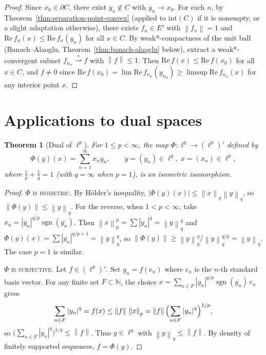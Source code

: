 \documentclass[a4paper,12pt]{book}
\DeclareMathOperator{\sgn}{sgn}
\newcommand{\N}{\mathbb{N}}
\newcommand{\norm}[1]{\left\| #1 \right\|}
\newcommand{\abs}[1]{\left| #1 \right|}
\newcommand{\weakstarto}{\overset{*}{\rightharpoonup}}
\theoremstyle{definition}
\theoremstyle{plain}
\newtheorem{theorem}[definition]{Theorem}
\theoremstyle{remark}
\begin{document}
\begin{proof}
Since $x_0\in\partial C$, there exist $y_n\notin C$ with $y_n\to x_0$.
For each $n$, by Theorem~\ref{thm:separation-point-convex} (applied to
$\mathrm{int}(C)$ if it is nonempty, or a slight adaptation otherwise),
there exists $f_n\in E'$ with $\norm{f_n}=1$ and
$\mathrm{Re}\,f_n(x)\leq\mathrm{Re}\,f_n(y_n)$ for all $x\in C$.
By weak*-compactness of the unit ball (Banach--Alaoglu, Theorem~\ref{thm:banach-alaoglu}
below), extract a weak*-convergent subnet $f_{n_\alpha}\weakstarto f$ with
$\norm{f}\leq 1$. Then $\mathrm{Re}\,f(x)\leq\mathrm{Re}\,f(x_0)$ for all
$x\in C$, and $f\neq 0$ since $\mathrm{Re}\,f(x_0)=\lim\mathrm{Re}\,f_{n_\alpha}(y_{n_\alpha})
\geq\limsup\mathrm{Re}\,f_{n_\alpha}(x)$ for any interior point $x$.
\end{proof}

\section{Applications to dual spaces}

\begin{theorem}[Dual of $\ell^p$]\label{thm:dual-ellp}
For $1\leq p<\infty$, the map $\Phi\colon\ell^q\to(\ell^p)'$ defined by
\[
  \Phi(y)(x) = \sum_{n=1}^{\infty}x_n y_n, \qquad y=(y_n)\in\ell^q,\;
  x=(x_n)\in\ell^p,
\]
where $\frac{1}{p}+\frac{1}{q}=1$ (with $q=\infty$ when $p=1$), is an
isometric isomorphism.
\end{theorem}

\begin{proof}
\textsc{$\Phi$ is isometric.}
By H\"older's inequality, $\abs{\Phi(y)(x)}\leq\norm{x}_p\norm{y}_q$, so
$\norm{\Phi(y)}\leq\norm{y}_q$. For the reverse, when $1<p<\infty$,
take $x_n = \abs{y_n}^{q/p}\sgn(\overline{y_n})$. Then
$\norm{x}_p^p = \sum\abs{y_n}^q = \norm{y}_q^q$ and
$\Phi(y)(x) = \sum\abs{y_n}^{q/p+1}=\norm{y}_q^q$, so
$\norm{\Phi(y)}\geq\norm{y}_q^q/\norm{y}_q^{q/p}=\norm{y}_q$.
The case $p=1$ is similar.

\textsc{$\Phi$ is surjective.}
Let $f\in(\ell^p)'$. Set $y_n = f(e_n)$ where $e_n$ is the $n$-th standard
basis vector. For any finite set $F\subset\N$, the choice
$x = \sum_{n\in F}\abs{y_n}^{q/p}\sgn(\overline{y_n})\,e_n$ gives
\[
  \sum_{n\in F}\abs{y_n}^q = f(x) \leq \norm{f}\,\norm{x}_p
  = \norm{f}\Bigl(\sum_{n\in F}\abs{y_n}^q\Bigr)^{1/p},
\]
so $\bigl(\sum_{n\in F}\abs{y_n}^q\bigr)^{1/q}\leq\norm{f}$. Thus
$y\in\ell^q$ with $\norm{y}_q\leq\norm{f}$. By density of finitely supported
sequences, $f=\Phi(y)$.
\end{proof}
\end{document}
